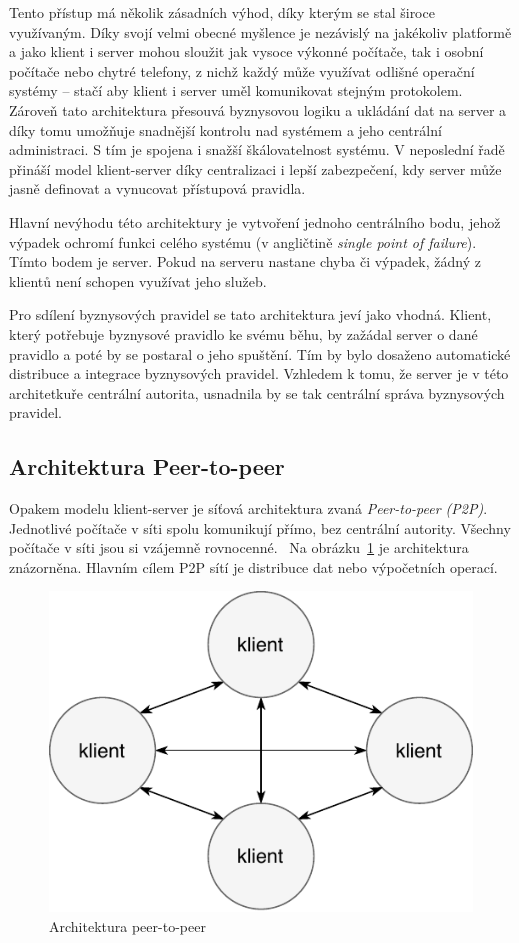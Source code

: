 Tento přístup má několik zásadních výhod, díky kterým se stal
široce využívaným. Díky svojí velmi obecné myšlence je nezávislý
na jakékoliv platformě a jako klient i server mohou sloužit
jak vysoce výkonné počítače, tak i osobní počítače nebo chytré telefony,
z nichž každý může využívat odlišné operační systémy –
stačí aby klient i server uměl komunikovat stejným protokolem.
Zároveň tato architektura přesouvá byznysovou logiku a
ukládání dat na server a díky tomu umožňuje
snadnější kontrolu nad systémem a jeho centrální administraci. S tím
je spojena i snažší škálovatelnost systému. V neposlední řadě
přináší model klient-server díky centralizaci i lepší zabezpečení,
kdy server může jasně definovat a vynucovat přístupová pravidla.

Hlavní nevýhodu této architektury je vytvoření jednoho centrálního bodu,
jehož výpadek ochromí funkci celého systému (v angličtině
\textit{single point of failure}). Tímto bodem je server.
Pokud na serveru nastane chyba či výpadek, žádný z klientů není schopen využívat
jeho služeb.

Pro sdílení byznysových pravidel se tato architektura jeví
jako vhodná. Klient, který potřebuje byznysové pravidlo ke
svému běhu, by zažádal server o dané pravidlo a poté by
se postaral o jeho spuštění. Tím by bylo dosaženo automatické
distribuce a integrace byznysových pravidel. Vzhledem k tomu,
že server je v této architetkuře centrální autorita, usnadnila
by se tak centrální správa byznysových pravidel.

\subsection{Architektura Peer-to-peer}\label{sec:p2p}

Opakem modelu klient-server je síťová architektura zvaná \textit{Peer-to-peer (\gls{P2P})}.
Jednotlivé počítače v síti spolu komunikují přímo, bez centrální autority.
Všechny počítače v síti jsou si vzájemně rovnocenné.~\cite{fox2001peer}
Na obrázku~\ref{fig:peer-to-peer} je architektura znázorněna.
Hlavním cílem \gls{P2P} sítí je distribuce dat nebo výpočetních operací.

\begin{figure}[t]
    \centering
    \includegraphics[keepaspectratio=true, width=0.4\linewidth]{figures/peer-to-peer.pdf}
    \caption{Architektura peer-to-peer}
    \label{fig:peer-to-peer}
\end{figure}

